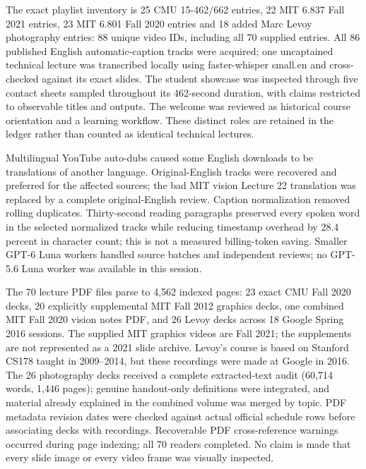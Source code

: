 The exact playlist inventory is 25 CMU 15-462/662 entries, 22 MIT 6.837 Fall 2021 entries, 23 MIT 6.801 Fall 2020 entries and 18 added Marc Levoy photography entries: 88 unique video IDs, including all 70 supplied entries. All 86 published English automatic-caption tracks were acquired; one uncaptained technical lecture was transcribed locally using faster-whisper small.en and cross-checked against its exact slides. The student showcase was inspected through five contact sheets sampled throughout its 462-second duration, with claims restricted to observable titles and outputs. The welcome was reviewed as historical course orientation and a learning workflow. These distinct roles are retained in the ledger rather than counted as identical technical lectures.

Multilingual YouTube auto-dubs caused some English downloads to be translations of another language. Original-English tracks were recovered and preferred for the affected sources; the bad MIT vision Lecture 22 translation was replaced by a complete original-English review. Caption normalization removed rolling duplicates. Thirty-second reading paragraphs preserved every spoken word in the selected normalized tracks while reducing timestamp overhead by 28.4 percent in character count; this is not a measured billing-token saving. Smaller GPT-6 Luna workers handled source batches and independent reviews; no GPT-5.6 Luna worker was available in this session.

The 70 lecture PDF files parse to 4,562 indexed pages: 23 exact CMU Fall 2020 decks, 20 explicitly supplemental MIT Fall 2012 graphics decks, one combined MIT Fall 2020 vision notes PDF, and 26 Levoy decks across 18 Google Spring 2016 sessions. The supplied MIT graphics videos are Fall 2021; the supplements are not represented as a 2021 slide archive. Levoy's course is based on Stanford CS178 taught in 2009--2014, but these recordings were made at Google in 2016. The 26 photography decks received a complete extracted-text audit (60,714 words, 1,446 pages); genuine handout-only definitions were integrated, and material already explained in the combined volume was merged by topic. PDF metadata revision dates were checked against actual official schedule rows before associating decks with recordings. Recoverable PDF cross-reference warnings occurred during page indexing; all 70 readers completed. No claim is made that every slide image or every video frame was visually inspected.

